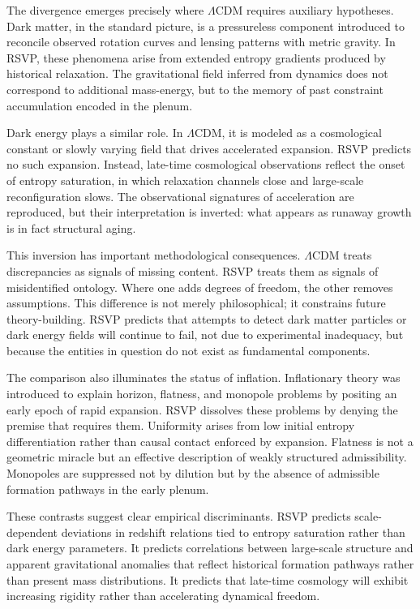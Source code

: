 \documentclass[11pt,oneside]{book}
\begin{document}
The divergence emerges precisely where \(\Lambda\)CDM requires auxiliary hypotheses. Dark matter, in the standard picture, is a pressureless component introduced to reconcile observed rotation curves and lensing patterns with metric gravity. In RSVP, these phenomena arise from extended entropy gradients produced by historical relaxation. The gravitational field inferred from dynamics does not correspond to additional mass-energy, but to the memory of past constraint accumulation encoded in the plenum.

Dark energy plays a similar role. In \(\Lambda\)CDM, it is modeled as a cosmological constant or slowly varying field that drives accelerated expansion. RSVP predicts no such expansion. Instead, late-time cosmological observations reflect the onset of entropy saturation, in which relaxation channels close and large-scale reconfiguration slows. The observational signatures of acceleration are reproduced, but their interpretation is inverted: what appears as runaway growth is in fact structural aging.

This inversion has important methodological consequences. \(\Lambda\)CDM treats discrepancies as signals of missing content. RSVP treats them as signals of misidentified ontology. Where one adds degrees of freedom, the other removes assumptions. This difference is not merely philosophical; it constrains future theory-building. RSVP predicts that attempts to detect dark matter particles or dark energy fields will continue to fail, not due to experimental inadequacy, but because the entities in question do not exist as fundamental components.

The comparison also illuminates the status of inflation. Inflationary theory was introduced to explain horizon, flatness, and monopole problems by positing an early epoch of rapid expansion. RSVP dissolves these problems by denying the premise that requires them. Uniformity arises from low initial entropy differentiation rather than causal contact enforced by expansion. Flatness is not a geometric miracle but an effective description of weakly structured admissibility. Monopoles are suppressed not by dilution but by the absence of admissible formation pathways in the early plenum.

These contrasts suggest clear empirical discriminants. RSVP predicts scale-dependent deviations in redshift relations tied to entropy saturation rather than dark energy parameters. It predicts correlations between large-scale structure and apparent gravitational anomalies that reflect historical formation pathways rather than present mass distributions. It predicts that late-time cosmology will exhibit increasing rigidity rather than accelerating dynamical freedom.
\end{document}
